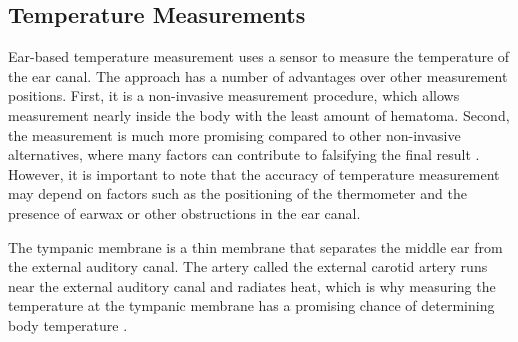 \subsection{Temperature Measurements}
Ear-based temperature measurement uses a sensor to measure the temperature of the ear canal. 
The approach has a number of advantages over other measurement positions.
First, it is a non-invasive measurement procedure, which allows measurement nearly inside the body with the least amount of hematoma.
Second, the measurement is much more promising compared to other non-invasive alternatives, where many factors can contribute to falsifying the final result \cite{ganioValidityReliabilityDevices2009, craigTemperatureMeasuredAxilla2000}. 
However, it is important to note that the accuracy of temperature measurement may depend on factors such as the positioning of the thermometer and the presence of earwax or other obstructions in the ear canal.

The tympanic membrane is a thin membrane that separates the middle ear from the external auditory canal. 
The artery called the external carotid artery runs near the external auditory canal and radiates heat, which is why measuring the temperature at the tympanic membrane has a promising chance of determining body temperature \cite{yeohRevisitingTympanicMembrane2017}.




